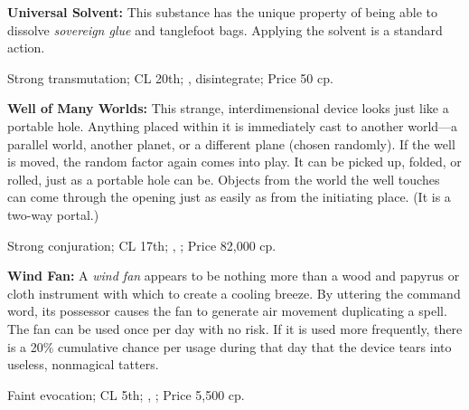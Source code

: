 \textbf{Universal Solvent:} This substance has the unique property of being able to dissolve \emph{sovereign glue} and tanglefoot bags. Applying the solvent is a standard action.

Strong transmutation; CL 20th; , {disintegrate}; Price 50 cp.



\textbf{Well of Many Worlds:} This strange, interdimensional device looks just like a portable hole. Anything placed within it is immediately cast to another world---a parallel world, another planet, or a different plane (chosen randomly). If the well is moved, the random factor again comes into play. It can be picked up, folded, or rolled, just as a portable hole can be. Objects from the world the well touches can come through the opening just as easily as from the initiating place. (It is a two-way portal.)

Strong conjuration; CL 17th; , ; Price 82,000 cp.



\textbf{Wind Fan:} A \emph{wind fan} appears to be nothing more than a wood and papyrus or cloth instrument with which to create a cooling breeze. By uttering the command word, its possessor causes the fan to generate air movement duplicating a  spell. The fan can be used once per day with no risk. If it is used more frequently, there is a 20\% cumulative chance per usage during that day that the device tears into useless, nonmagical tatters.

Faint evocation; CL 5th; , ; Price 5,500 cp.
